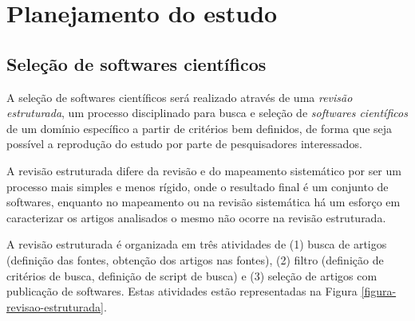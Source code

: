 \section{Planejamento do estudo}

% 
%
%

\subsection{Seleção de softwares científicos}

A seleção de softwares científicos será realizado através de uma {\it revisão
estruturada}, um processo disciplinado para busca e seleção de {\it softwares
científicos} de um domínio específico a partir de critérios bem definidos, de
forma que seja possível a reprodução do estudo por parte de pesquisadores
interessados.

A revisão estruturada difere da revisão e do mapeamento sistemático por ser um
processo mais simples e menos rígido, onde o resultado final é um conjunto de
softwares, enquanto no mapeamento ou na revisão sistemática há um esforço em
caracterizar os artigos analisados o mesmo não ocorre na revisão estruturada.

A revisão estruturada é organizada em três atividades de (1) busca de artigos
(definição das fontes, obtenção dos artigos nas fontes), (2) filtro (definição
de critérios de busca, definição de script de busca) e (3) seleção de artigos
com publicação de softwares. Estas atividades estão representadas na Figura
\ref{figura-revisao-estruturada}.

